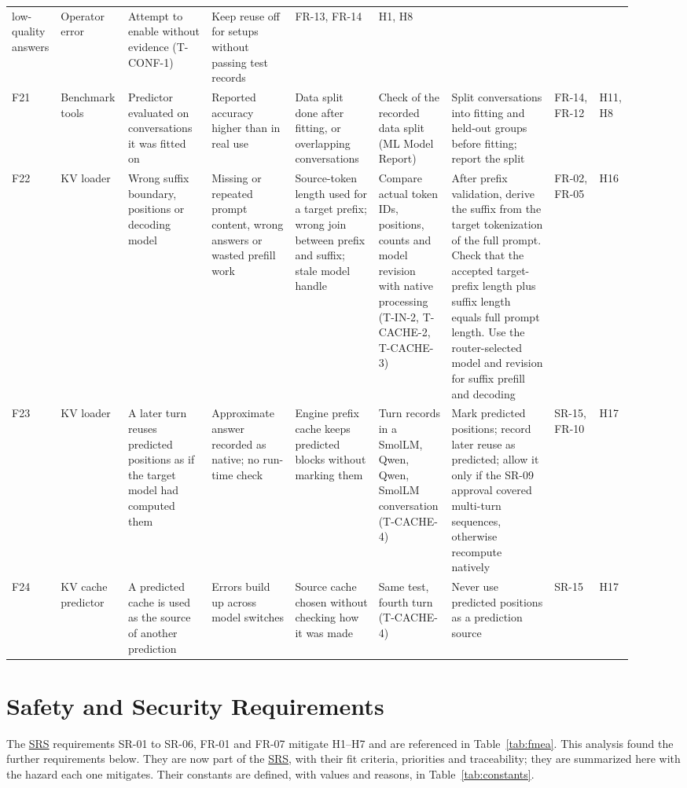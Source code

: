 \documentclass{article}
\newcommand{\srs}{\href{https://tandemkv.github.io/Tandem/SRS-Volere/SRS.pdf}{SRS}}
\begin{document}
\begin{landscape}
\begin{longtable}{@{}p{0.04\linewidth}p{0.10\linewidth}p{0.13\linewidth}%
p{0.13\linewidth}p{0.13\linewidth}p{0.11\linewidth}p{0.16\linewidth}%
p{0.07\linewidth}p{0.05\linewidth}@{}}
low-quality answers & Operator error & Attempt to enable without evidence
(T-CONF-1) & Keep reuse off for setups without passing test records & FR-13,
FR-14 & H1, H8\\
F21 & Benchmark tools & Predictor evaluated on conversations it was
fitted on & Reported accuracy higher than in real use & Data split done
after fitting, or overlapping conversations & Check of the recorded data
split (ML Model Report) & Split conversations into fitting and held-out
groups before fitting; report the split & FR-14, FR-12 & H11, H8\\
F22 & KV loader & Wrong suffix boundary, positions or decoding model &
Missing or repeated prompt content, wrong answers or wasted prefill work &
Source-token length used for a target prefix; wrong join between prefix
and suffix; stale model handle & Compare actual token IDs, positions,
counts and model revision with native processing (T-IN-2, T-CACHE-2,
T-CACHE-3) & After prefix validation, derive the suffix from the target
tokenization of the full prompt. Check that the accepted target-prefix
length plus suffix length equals full prompt length. Use the router-selected
model and revision for suffix prefill and decoding & FR-02, FR-05 & H16\\
F23 & KV loader & A later turn reuses predicted positions as if the target
model had computed them & Approximate answer recorded as native; no run-time
check & Engine prefix cache keeps predicted blocks without marking them &
Turn records in a SmolLM, Qwen, Qwen, SmolLM conversation (T-CACHE-4) & Mark
predicted positions; record later reuse as predicted; allow it only if the
SR-09 approval covered multi-turn sequences, otherwise recompute natively &
SR-15, FR-10 & H17\\
F24 & KV cache predictor & A predicted cache is used as the source of
another prediction & Errors build up across model switches & Source cache
chosen without checking how it was made & Same test, fourth turn (T-CACHE-4)
& Never use predicted positions as a prediction source & SR-15 & H17\\
\bottomrule
\end{longtable}
\end{landscape}

\section{Safety and Security Requirements}
\label{sec:requirements}

The \srs{} requirements SR-01 to SR-06, FR-01 and FR-07 mitigate H1--H7 and
are referenced in Table~\ref{tab:fmea}. This analysis found the further
requirements below. They are now part of the \srs{}, with their fit criteria,
priorities and traceability; they are summarized here with the hazard each
one mitigates. Their constants are defined, with values and reasons, in
Table~\ref{tab:constants}.
\end{document}

